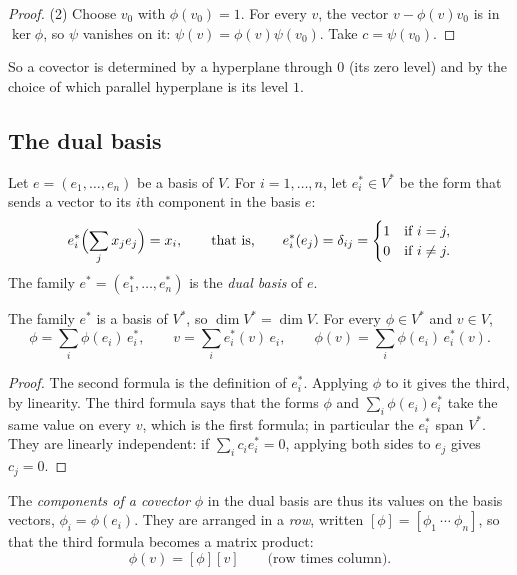 \begin{notechapter}
\begin{proof}
(2) Choose $v_0$ with $\phi(v_0) = 1$. For every $v$, the vector
$v - \phi(v)v_0$ is in $\ker\phi$, so $\psi$ vanishes on it:
$\psi(v) = \phi(v)\psi(v_0)$. Take $c = \psi(v_0)$.
\end{proof}

So a covector is determined by a hyperplane through $0$ (its zero level)
and by the choice of which parallel hyperplane is its level $1$.

\subsection{The dual basis}

\begin{definition}\label{duality:def:dual-basis}
Let $e = (e_1,\dots,e_n)$ be a basis of $V$. For $i = 1,\dots,n$, let
$e_i^*\in V^*$ be the form that sends a vector to its $i$th component in
the basis $e$:
\[
  e_i^*\Bigl(\sum_jx_je_j\Bigr) = x_i ,
  \qquad\text{that is,}\qquad
  e_i^*(e_j) = \delta_{ij} =
  \begin{cases}1 & \text{if } i = j,\\ 0 & \text{if } i\neq j.\end{cases}
\]
The family $e^* = (e_1^*,\dots,e_n^*)$ is the \emph{dual basis} of $e$.
\end{definition}

\begin{theorem}\label{duality:thm:dual-basis}
The family $e^*$ is a basis of $V^*$, so $\dim V^* = \dim V$. For every
$\phi\in V^*$ and $v\in V$,
\[
  \phi = \sum_i\phi(e_i)\,e_i^* ,
  \qquad
  v = \sum_ie_i^*(v)\,e_i ,
  \qquad
  \phi(v) = \sum_i\phi(e_i)\,e_i^*(v) .
\]
\end{theorem}

\begin{proof}
The second formula is the definition of $e_i^*$. Applying $\phi$ to it
gives the third, by linearity. The third formula says that the forms
$\phi$ and $\sum_i\phi(e_i)e_i^*$ take the same value on every $v$, which
is the first formula; in particular the $e_i^*$ span $V^*$. They are
linearly independent: if $\sum_ic_ie_i^* = 0$, applying both sides to
$e_j$ gives $c_j = 0$.
\end{proof}

The \emph{components of a covector} $\phi$ in the dual basis are thus its
values on the basis vectors, $\phi_i = \phi(e_i)$. They are arranged in a
\emph{row}, written $[\phi] = [\phi_1\ \cdots\ \phi_n]$, so that the third
formula becomes a matrix product:
\[
  \phi(v) = [\phi][v] \qquad\text{(row times column).}
\]


\end{notechapter}

